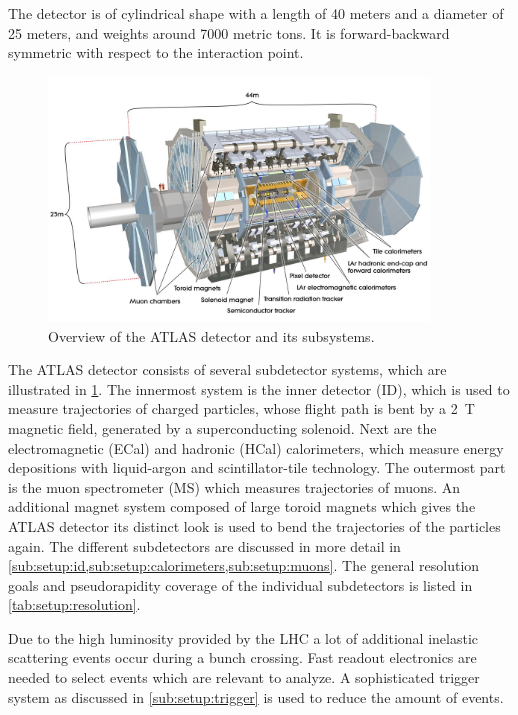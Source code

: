 The detector is of cylindrical shape with a length of 40 meters and a diameter of 25 meters, and weights around 7000 metric tons.
It is forward-backward symmetric with respect to the interaction point.

\begin{figure}[htb]
    \centering
    \includegraphics[width=0.9\textwidth]{./figures/setup/atlas.jpg}
    \caption{Overview of the ATLAS detector and its subsystems.~\cite{ImageATLAS}}\label{fig:setup:atlas}
\end{figure}

The ATLAS detector consists of several subdetector systems, which are illustrated in \cref{fig:setup:atlas}.
The innermost system is the inner detector (ID), which is used to measure trajectories
of charged particles, whose flight path is bent by a \SI{2}{\tesla} magnetic field, generated by a superconducting solenoid.
Next are the electromagnetic (ECal) and hadronic (HCal) calorimeters, which measure energy depositions with
liquid-argon and scintillator-tile technology.
The outermost part is the muon spectrometer (MS) which measures trajectories of muons.
An additional magnet system composed of large toroid magnets which gives the ATLAS detector its distinct look is used
to bend the trajectories of the particles again.
The different subdetectors are discussed in more detail in
\cref{sub:setup:id,sub:setup:calorimeters,sub:setup:muons}.
The general resolution goals and pseudorapidity coverage of the individual subdetectors is listed in \cref{tab:setup:resolution}.

Due to the high luminosity provided by the LHC a lot of additional inelastic scattering events occur during
a bunch crossing.
Fast readout electronics are needed to select events which are relevant to analyze.
A sophisticated trigger system as discussed in \cref{sub:setup:trigger} is used to reduce the amount of events.

